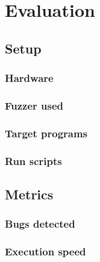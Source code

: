 
\chapter{Evaluation}\label{chapter:evaluation}

\section{Setup}

\subsection{Hardware}

\subsection{Fuzzer used}

\subsection{Target programs}

\subsection{Run scripts}


\section{Metrics} %

\subsection{Bugs detected}


\subsection{Execution speed}
